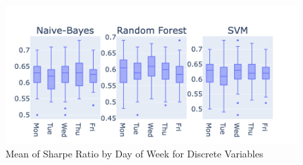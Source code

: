\documentclass[aodsor,preprint]{imsart}
\numberwithin{equation}{section}
\theoremstyle{plain}
\begin{document}
\begin{figure}[H]
  \centering
  \includegraphics[width=\textwidth]{plots/sharpe.png}
  \caption{Mean of Sharpe Ratio by Day of Week for Discrete Variables}
  \label{fig:plot11}
\end{figure}






\end{document}
